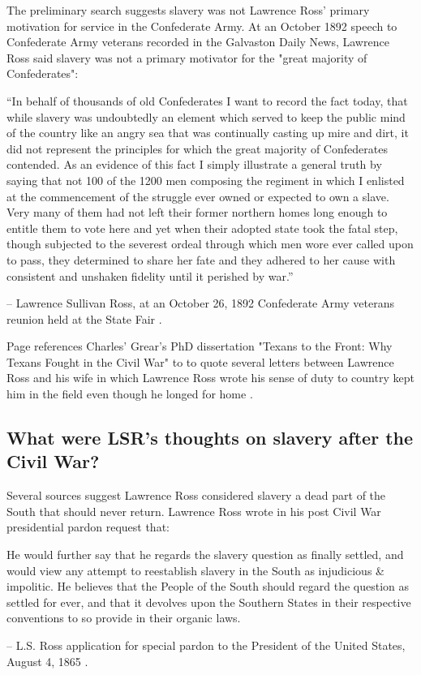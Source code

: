 \documentclass[12pt]{article}
\begin{document}
The preliminary search suggests slavery was not Lawrence Ross' primary motivation for service in the Confederate Army. At an October 1892 speech to Confederate Army veterans recorded in the Galvaston Daily News, Lawrence Ross said slavery was not a primary motivator for the "great majority of Confederates":

\begin{displayquote}
“In behalf of thousands of old Confederates I want to record the fact today, that while slavery was undoubtedly an element which served to keep the public mind of the country like an angry sea that was continually casting up mire and dirt, it did not represent the principles for which the great majority of Confederates contended.  As an evidence of this fact I simply illustrate a general truth by saying that not 100 of the 1200 men composing the regiment in which I enlisted at the commencement of the struggle ever owned or expected to own a slave.  Very many of them had not left their former northern homes long enough to entitle them to vote here and yet when their adopted state took the fatal step, though subjected to the severest ordeal through which men wore ever called upon to pass, they determined to share her fate and they adhered to her cause with consistent and unshaken fidelity until it perished by war.” 

-- Lawrence Sullivan Ross, at an October 26, 1892 Confederate Army veterans reunion held at the State Fair \cite{gdaily:1892-10-26}.
\end{displayquote}

Page references Charles' Grear's PhD dissertation "Texans to the Front: Why Texans Fought in the Civil War" to to quote several letters between Lawrence Ross and his wife in which Lawrence Ross wrote his sense of duty to country kept him in the field even though he longed for home \cite[pg. 59--60]{page}.

\subsection{What were LSR's thoughts on slavery after the Civil War?}
Several sources suggest Lawrence Ross considered slavery a dead part of the South that should never return. Lawrence Ross wrote in his post Civil War presidential pardon request that:

\begin{displayquote}
He would further say that he regards the slavery question as finally settled, and would view any attempt to reestablish slavery in the South as injudicious \& impolitic.  He believes that the People of the South should regard the question as settled for ever, and that it devolves upon the Southern States in their respective conventions to so provide in their organic laws.

-- L.S. Ross application for special pardon to the President of the United States, August 4, 1865 \cite{pardonrequest}.
\end{displayquote}
\end{document}
